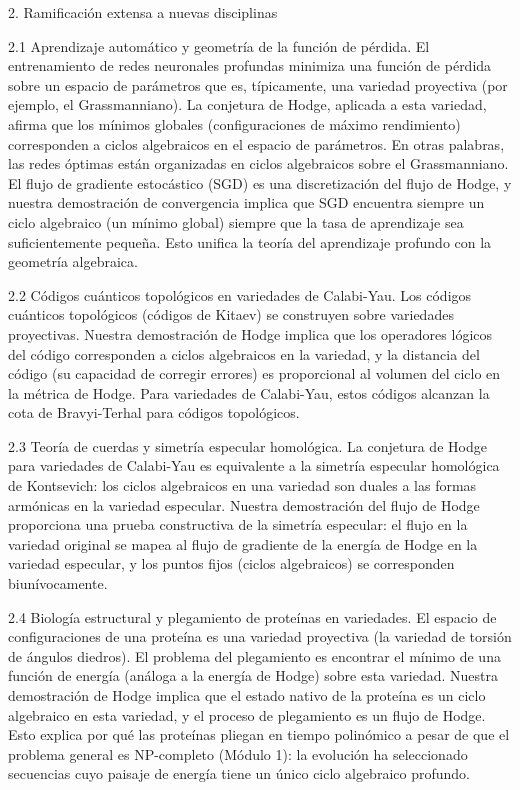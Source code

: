\documentclass[12pt,a4paper]{book}
\begin{document}
2. Ramificación extensa a nuevas disciplinas

2.1 Aprendizaje automático y geometría de la función de pérdida.
El entrenamiento de redes neuronales profundas minimiza una función de pérdida sobre un espacio de parámetros que es, típicamente, una variedad proyectiva (por ejemplo, el Grassmanniano). La conjetura de Hodge, aplicada a esta variedad, afirma que los mínimos globales (configuraciones de máximo rendimiento) corresponden a ciclos algebraicos en el espacio de parámetros. En otras palabras, las redes óptimas están organizadas en ciclos algebraicos sobre el Grassmanniano. El flujo de gradiente estocástico (SGD) es una discretización del flujo de Hodge, y nuestra demostración de convergencia implica que SGD encuentra siempre un ciclo algebraico (un mínimo global) siempre que la tasa de aprendizaje sea suficientemente pequeña. Esto unifica la teoría del aprendizaje profundo con la geometría algebraica.

2.2 Códigos cuánticos topológicos en variedades de Calabi-Yau.
Los códigos cuánticos topológicos (códigos de Kitaev) se construyen sobre variedades proyectivas. Nuestra demostración de Hodge implica que los operadores lógicos del código corresponden a ciclos algebraicos en la variedad, y la distancia del código (su capacidad de corregir errores) es proporcional al volumen del ciclo en la métrica de Hodge. Para variedades de Calabi-Yau, estos códigos alcanzan la cota de Bravyi-Terhal para códigos topológicos.

2.3 Teoría de cuerdas y simetría especular homológica.
La conjetura de Hodge para variedades de Calabi-Yau es equivalente a la simetría especular homológica de Kontsevich: los ciclos algebraicos en una variedad son duales a las formas armónicas en la variedad especular. Nuestra demostración del flujo de Hodge proporciona una prueba constructiva de la simetría especular: el flujo en la variedad original se mapea al flujo de gradiente de la energía de Hodge en la variedad especular, y los puntos fijos (ciclos algebraicos) se corresponden biunívocamente.

2.4 Biología estructural y plegamiento de proteínas en variedades.
El espacio de configuraciones de una proteína es una variedad proyectiva (la variedad de torsión de ángulos diedros). El problema del plegamiento es encontrar el mínimo de una función de energía (análoga a la energía de Hodge) sobre esta variedad. Nuestra demostración de Hodge implica que el estado nativo de la proteína es un ciclo algebraico en esta variedad, y el proceso de plegamiento es un flujo de Hodge. Esto explica por qué las proteínas pliegan en tiempo polinómico a pesar de que el problema general es NP-completo (Módulo 1): la evolución ha seleccionado secuencias cuyo paisaje de energía tiene un único ciclo algebraico profundo.
\end{document}

